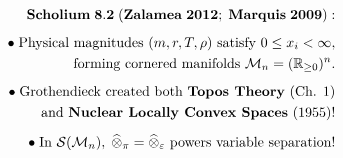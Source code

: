 \documentclass[preview]{standalone}
\begin{document}
\begin{align*}
\special{dvisvgm:raw <g id='unique000'>}\mathbf{Scholium\;8.2\;(Zalamea\;2012;\;Marquis\;2009):}\\[5pt]\bullet\;\text{Physical magnitudes }(m, r, T, \rho)\text{ satisfy }0\le x_i<\infty,\\\;\;\text{forming cornered manifolds }\mathcal{M}_n=(\mathbb{R}_{\ge 0})^n.\\[5pt]\bullet\;\text{Grothendieck created both }\textbf{Topos Theory}\text{ (Ch. 1)}\\\;\;\text{and }\textbf{Nuclear Locally Convex Spaces}\text{ (1955)!}\\[5pt]\bullet\;\text{In }\mathcal{S}(\mathcal{M}_n),\;\widehat{\otimes}_\pi = \widehat{\otimes}_\varepsilon\text{ powers variable separation!}\special{dvisvgm:raw </g>}
\end{align*}
\end{document}
